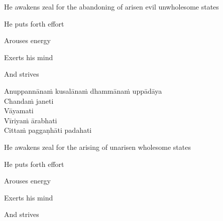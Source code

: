 \begin{english-verses}
\begin{english-hang-first-line}
  He awakens zeal for the abandoning of arisen evil unwholesome states\\
\end{english-hang-first-line}
\begin{english-hang-together-verses}
  He puts forth effort\\
\end{english-hang-together-verses}
\begin{english-hang-together-verses}
  Arouses energy\\
\end{english-hang-together-verses}
\begin{english-hang-together-verses}
  Exerts his mind\\
\end{english-hang-together-verses}
\begin{english-hang-together-verses}
  And strives
\end{english-hang-together-verses}
\end{english-verses}

Anuppannānaṁ kusalānaṁ dhammānaṁ uppādāya\\
Chandaṁ janeti\\
Vāyamati\\
Vīriyaṁ ārabhati\\
Cittaṁ paggaṇhāti padahati

\begin{english-verses}
\begin{english-hang-first-line}
  He awakens zeal for the arising of unarisen wholesome states\\
\end{english-hang-first-line}
\begin{english-hang-together-verses}
  He puts forth effort\\
\end{english-hang-together-verses}
\begin{english-hang-together-verses}
  Arouses energy\\
\end{english-hang-together-verses}
\begin{english-hang-together-verses}
  Exerts his mind\\
\end{english-hang-together-verses}
\begin{english-hang-together-verses}
  And strives
\end{english-hang-together-verses}
\end{english-verses}


